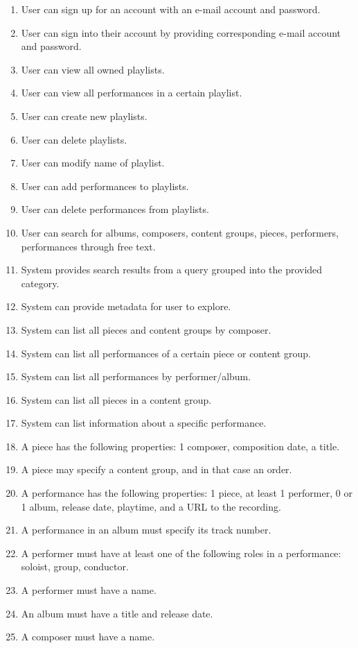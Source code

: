 \begin{enumerate}
    \item User can sign up for an account with an e-mail account and password.
    \item User can sign into their account by providing corresponding e-mail
        account and password.
    \item User can view all owned playlists.
    \item User can view all performances in a certain playlist.
    \item User can create new playlists.
    \item User can delete playlists.
    \item User can modify name of playlist.
    \item User can add performances to playlists.
    \item User can delete performances from playlists.
    \item User can search for albums, composers, content groups, pieces,
        performers, performances through free text.
    \item System provides search results from a query grouped into the provided
        category.
    \item System can provide metadata for user to explore.
    \item System can list all pieces and content groups by composer.
    \item System can list all performances of a certain piece or content group.
    \item System can list all performances by performer/album.
    \item System can list all pieces in a content group.
    \item System can list information about a specific performance.
    \item A piece has the following properties: 1 composer, composition date, a
        title.
    \item A piece may specify a content group, and in that case an order.
    \item A performance has the following properties: 1 piece, at least 1
        performer, 0 or 1 album, release date, playtime, and a URL to the
        recording.
    \item A performance in an album must specify its track number.
    \item A performer must have at least one of the following roles in a
        performance: soloist, group, conductor.
    \item A performer must have a name. 
    \item An album must have a title and release date.
    \item A composer must have a name.
\end{enumerate}

